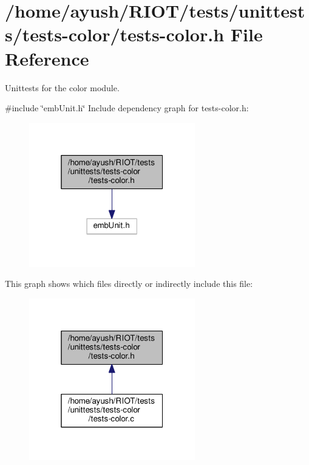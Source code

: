 \hypertarget{tests-color_8h}{}\section{/home/ayush/\+R\+I\+O\+T/tests/unittests/tests-\/color/tests-\/color.h File Reference}
\label{tests-color_8h}


Unittests for the {\ttfamily color} module.  


{\ttfamily \#include \char`\"{}emb\+Unit.\+h\char`\"{}}\newline
Include dependency graph for tests-\/color.h\+:
\nopagebreak
\begin{figure}[H]
\begin{center}
\leavevmode
\includegraphics[width=205pt]{tests-color_8h__incl}
\end{center}
\end{figure}
This graph shows which files directly or indirectly include this file\+:
\nopagebreak
\begin{figure}[H]
\begin{center}
\leavevmode
\includegraphics[width=205pt]{tests-color_8h__dep__incl}
\end{center}
\end{figure}
